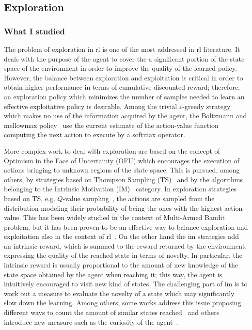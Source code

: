 \subsection{Exploration}
\subsubsection{What I studied}
The problem of exploration in \gls{rl} is one of the most addressed in \gls{rl} literature. It deals with the purpose of the agent to cover the a significant portion of the state space of the environment in order to improve the quality of the learned policy. However, the balance between exploration and exploitation is critical in order to obtain higher performance in terms of cumulative discounted reward; therefore, an exploration policy which minimizes the number of samples needed to learn an effective exploitative policy is desirable. Among the trivial $\varepsilon$-greedy strategy which makes no use of the information acquired by the agent, the Boltzmann and mellowmax policy~\cite{asadi2016alternative} use the current estimate of the action-value function computing the next action to execute by a softmax operator.

More complex work to deal with exploration are based on the concept of Optimism in the Face of Uncertainty (OFU) which encourages the execution of actions bringing to unknown regions of the state space. This is pursued, among others, by strategies based on Thompson Sampling (TS)~\cite{thompson1933likelihood} and by the algorithms belonging to the Intrinsic Motivation (IM)~\cite{schmidhuber1991possibility} category. In exploration strategies based on TS, e.g. $Q$-value sampling~\cite{dearden1998bayesian}, the actions are sampled from the distribution modeling their probability of being the ones with the highest action-value. This has been widely studied in the context of Multi-Armed Bandit problem, but it has been proven to be an effective way to balance exploration and exploitation also in the context of \gls{rl}~\cite{auer2007logarithmic}. On the other hand the \gls{im} strategies add an intrinsic reward, which is summed to the reward returned by the environment, expressing the quality of the reached state in terms of novelty. In particular, the intrinsic reward is usually proportional to the amount of new knowledge of the state space obtained by the agent when reaching it; this way, the agent is intuitively encouraged to visit new kind of states. The challenging part of \gls{im} is to work out a measure to evaluate the novelty of a state which may significantly slow down the learning. Among others, some works address this issue proposing different ways to count the amount of similar states reached~\cite{tang2017exploration} and others introduce new measure such as the curiosity of the agent~\cite{schmidhuber1991possibility, pathak2017curiosity}.

